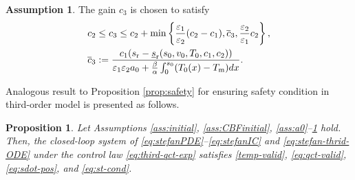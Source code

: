 \documentclass[letterpaper, 10 pt, conference]{cls/ieeeconf}
\newtheorem{proposition}{Proposition}
\theoremstyle{definition}
\newtheorem{assum}{Assumption}
\newcommand{\ep}{\varepsilon}
\begin{document}
\begin{assum} \label{ass:third-gain3}
    The gain $c_3$ is chosen to satisfy 
       \begin{align} \label{eq:third-gain3-cond}
        c_2 & \leq c_3 \leq c_2 + \min \left\{\frac{\ep_1}{\ep_2}(c_2 - c_1) , \overline{c}_3, 
        \frac{\ep_2}{\ep_1} c_2
        \right\} , \\
      \overline{c}_3 & :=   \frac{c_1 ( s_{\rm r} - \underline{s}_{\rm r}(s_0, v_0, T_0, c_1, c_2))}{ \ep_1 \ep_2 a_0 +  \frac{ \beta }{\alpha}  \int_0^{s_0}  (T_0(x) - T_{\rm m})  dx }.  
    \end{align}
\end{assum}

Analogous result to Proposition \ref{prop:safety} for ensuring safety condition in third-order model is presented as follows. 
\begin{proposition}
    Let Assumptions \ref{ass:initial}, \ref{ass:CBFinitial}, \ref{ass:a0}--\ref{ass:third-gain3} hold. Then, the closed-loop system of \eqref{eq:stefanPDE}--\eqref{eq:stefanIC} and \eqref{eq:stefan-thrid-ODE} under the control law \eqref{eq:third-qct-exp} satisfies \eqref{temp-valid}, \eqref{eq:qct-valid}, \eqref{eq:sdot-pos}, and \eqref{eq:st-cond}. 
\end{proposition}
\end{document}
